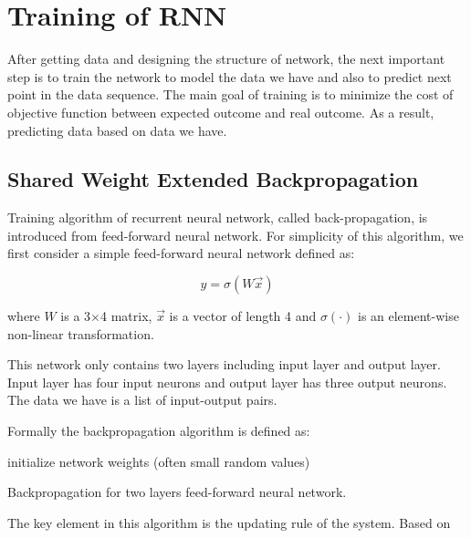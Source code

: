 \documentclass[officiallayout]{tktla}
\begin{document}
\section{Training of RNN}\label{training_rnn}
After getting data and designing the structure of network, the next important step is to train the network to model the data we have and also to predict next point in the data sequence. The main goal of training is to minimize the cost of objective function between expected outcome and real outcome. As a result, predicting data based on data we have.

\subsection{Shared Weight Extended Backpropagation}

Training algorithm of recurrent neural network, called back-propagation, is introduced from feed-forward neural network. For simplicity of this algorithm, we first consider a simple feed-forward neural network defined as:

\begin{equation}
y = \sigma(W\vec{x})
\end{equation}

where $W$ is a 3$\times$4 matrix, $\vec{x}$ is a vector of length 4 and $\sigma(\cdot)$ is an element-wise non-linear transformation.

This network only contains two layers including input layer and output layer. Input layer has four input neurons and output layer has three output neurons. The data we have is a list of input-output pairs.

Formally the backpropagation algorithm is defined as:

\begin{algorithm}
 initialize network weights (often small random values)\;
 \caption{Backpropagation for two layers feed-forward neural network.}\label{backpropagation}
\end{algorithm}

The key element in this algorithm is the updating rule of the system. Based on 
\end{document}
